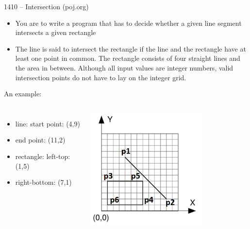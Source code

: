 \begin{frame}{1410 -- Intersection (poj.org)}
    \begin{itemize}
        \item You are to write a program that has to decide whether a given line segment intersects a given rectangle
        \item The line is said to intersect the rectangle if the line and the rectangle have at least one point in common. The rectangle consists of four straight lines and the area in between. Although all input values are integer numbers, valid intersection points do not have to lay on the integer grid.
    \end{itemize}  
    \begin{exampleblock}{An example:}
        \begin{columns}   
            \begin{itemize}
                \item line: start point: (4,9)
                \item end point: (11,2)
                \item rectangle: left-top: (1,5)
                \item right-bottom: (7,1)
            \end{itemize}
            \includegraphics[width=0.7\textwidth]{fig/9-4.png}
        \end{columns}
    \end{exampleblock}
\end{frame}

